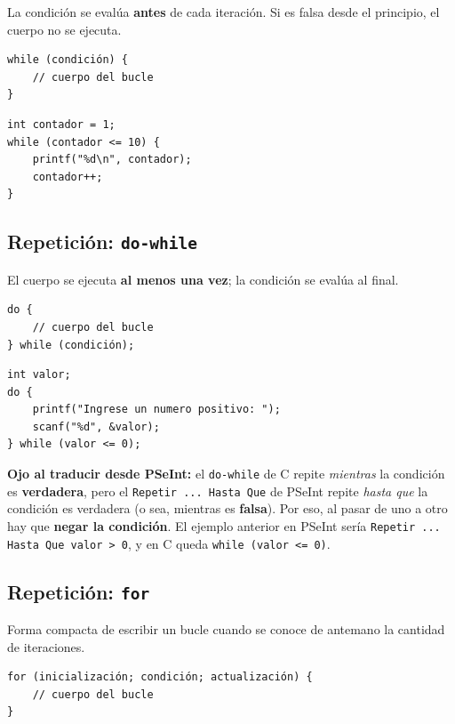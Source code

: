 La condición se evalúa \textbf{antes} de cada iteración. Si es falsa desde el principio, el cuerpo no se ejecuta.

\begin{lstlisting}[style=estilo-c]
while (condición) {
    // cuerpo del bucle
}
\end{lstlisting}

\begin{lstlisting}[style=estilo-c]
int contador = 1;
while (contador <= 10) {
    printf("%d\n", contador);
    contador++;
}
\end{lstlisting}

\subsection{Repetición: \texttt{do-while}}

El cuerpo se ejecuta \textbf{al menos una vez}; la condición se evalúa al final.

\begin{lstlisting}[style=estilo-c]
do {
    // cuerpo del bucle
} while (condición);
\end{lstlisting}

\begin{lstlisting}[style=estilo-c]
int valor;
do {
    printf("Ingrese un numero positivo: ");
    scanf("%d", &valor);
} while (valor <= 0);
\end{lstlisting}

\begin{advertenciabox}
\textbf{Ojo al traducir desde PSeInt:} el \texttt{do-while} de C repite \emph{mientras} la condición es \textbf{verdadera}, pero el \texttt{Repetir ... Hasta Que} de PSeInt repite \emph{hasta que} la condición es verdadera (o sea, mientras es \textbf{falsa}). Por eso, al pasar de uno a otro hay que \textbf{negar la condición}. El ejemplo anterior en PSeInt sería \texttt{Repetir ... Hasta Que valor > 0}, y en C queda \texttt{while (valor <= 0)}.
\end{advertenciabox}

\subsection{Repetición: \texttt{for}}

Forma compacta de escribir un bucle cuando se conoce de antemano la cantidad de iteraciones.

\begin{lstlisting}[style=estilo-c]
for (inicialización; condición; actualización) {
    // cuerpo del bucle
}
\end{lstlisting}

